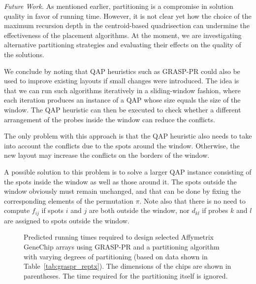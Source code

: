 \documentclass{bioinfo}
\newcommand{\paragraph}[1]{\par\textit{#1}}
\begin{document}
\paragraph{Future Work.}
As mentioned earlier, partitioning is a compromise in solution quality in favor of running time. However, it is not clear yet how the choice of the maximum recursion depth in the centroid-based quadrisection can undermine the effectiveness of the placement algorithms. At the moment, we are investigating alternative partitioning strategies and evaluating their effects on the quality of the solutions.

We conclude by noting that QAP heuristics such as GRASP-PR could also be used to improve existing layouts if small changes were introduced. The idea is that we can run such algorithms iteratively in a sliding-window fashion, where each iteration produces an instance of a QAP whose size equals the size of the window. The QAP heuristic can then be executed to check whether a different arrangement of the probes inside the window can reduce the conflicts.

The only problem with this approach is that the QAP heuristic also needs to take into account the conflicts due to the spots around the window. Otherwise, the new layout may increase the conflicts on the borders of the window.

A possible solution to this problem is to solve a larger QAP instance
consisting of the spots inside the window as well as those around it. The
spots outside the window obviously must remain unchanged, and that can be done
by fixing the corresponding elements of the permutation $\pi$. Note also that
there is no need to compute $f_{ij}$ if spots $i$ and $j$ are both outside the
window, nor $d_{kl}$ if probes $k$ and $l$ are assigned to spots outside the
window.

\begin{figure}
{\footnotesize \centerline{}}
\caption{Predicted running times required to design selected Affymetrix GeneChip arrays using GRASP-PR and a partitioning algorithm with varying degrees of partitioning (based on data shown in Table~\ref{tab:graspr_reptx}). The dimensions of the chips are shown in parentheses. The time required for the partitioning itself is ignored.}\label{fig:time_extrapolation}
\end{figure}
\end{document}
